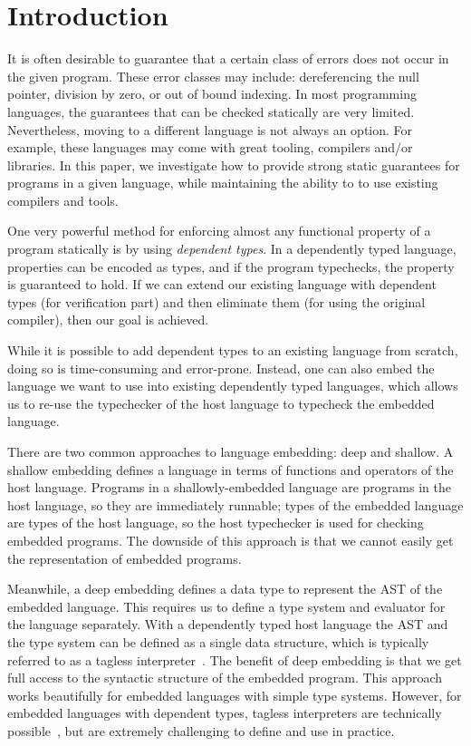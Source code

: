 \documentclass[sigplan,anonymous,review]{acmart}
\begin{document}
\section{Introduction}\label{sec:introduction}

It is often desirable to guarantee that a
certain class of errors does not occur in the given program.  These
error classes may include: dereferencing the null pointer, division
by zero, or out of bound indexing.  In most
programming languages, the guarantees that can be checked
statically are very limited.  Nevertheless, moving to a different
language is not always an option.  For example, these languages may
come with great tooling, compilers and/or libraries.  In this paper, we
investigate how to provide strong static guarantees for programs in a
given language, while maintaining the ability to to use existing
compilers and tools.

One very powerful method for enforcing almost any functional property
of a program statically is by using \emph{dependent types}.
In a dependently typed language, properties can be encoded as types,
and if the program typechecks, the property is guaranteed to hold.
If we can extend our existing language with dependent types
(for verification part) and then eliminate them (for using the original
compiler), then our goal is achieved.

While it is possible to add dependent types to an existing language
from scratch, doing so is time-consuming and error-prone.  Instead,
one can also embed the language we want to use into existing
dependently typed languages, which allows us to re-use the typechecker
of the host language to typecheck the embedded language.

There are two common approaches to language embedding: deep and shallow.
A shallow embedding defines a language in terms of functions and operators
of the host language.  Programs in a shallowly-embedded language are programs
in the host language, so they are immediately runnable; types of the embedded
language are types of the host language, so the host typechecker is used for
checking embedded programs.  The downside of this approach is that we cannot
easily get the representation of embedded programs.

Meanwhile, a deep embedding defines a data type to represent the AST
of the embedded language.  This requires us to define a type system
and evaluator for the language separately.  With a dependently typed
host language the AST and the type system can be defined as a single
data structure, which is typically referred to as a tagless
interpreter~\cite{}.  The benefit of deep embedding is that we get
full access to the syntactic structure of the embedded program.  This
approach works beautifully for embedded languages with simple type
systems. However, for embedded languages with dependent types,
tagless interpreters are technically possible~\cite{}, but
are extremely challenging to define and use in practice.
\end{document}
